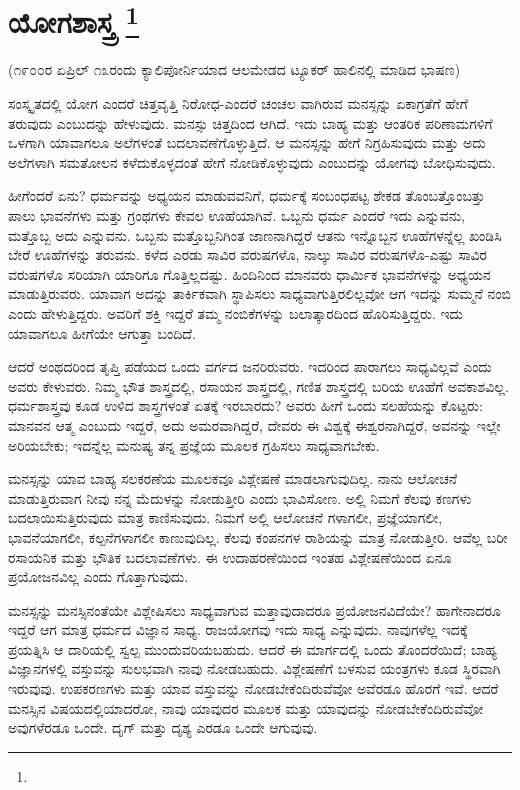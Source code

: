 
\chapter[ಯೋಗಶಾಸ್ತ್ರ ]{ಯೋಗಶಾಸ್ತ್ರ \protect\footnote{}}

\centerline{(೧೯೦೦ರ ಏಪ್ರಿಲ್​ ೧೩ರಂದು ಕ್ಯಾಲಿಪೋರ್ನಿಯಾದ ಆಲಮೇಡದ ಟ್ಯೂಕರ್​ ಹಾಲಿನಲ್ಲಿ ಮಾಡಿದ ಭಾಷಣ)}

ಸಂಸ್ಕೃತದಲ್ಲಿ ಯೋಗ ಎಂದರೆ ಚಿತ್ತವೃತ್ತಿ ನಿರೋಧ-ಎಂದರೆ ಚಂಚಲ ವಾಗಿರುವ ಮನಸ್ಸನ್ನು ಏಕಾಗ್ರತೆಗೆ ಹೇಗೆ ತರುವುದು ಎಂಬುದನ್ನು ಹೇಳುವುದು. ಮನಸ್ಸು ಚಿತ್ತದಿಂದ ಆಗಿದೆ. ಇದು ಬಾಹ್ಯ ಮತ್ತು ಆಂತರಿಕ ಪರಿಣಾಮಗಳಿಗೆ ಒಳಗಾಗಿ ಯಾವಾಗಲೂ ಅಲೆಗಳಂತೆ ಬದಲಾವಣೆಗೊಳ್ಳುತ್ತಿದೆ. ಆ ಮನಸ್ಸನ್ನು ಹೇಗೆ ನಿಗ್ರಹಿಸುವುದು ಮತ್ತು ಅದು ಅಲೆಗಳಾಗಿ ಸಮತೋಲನ ಕಳೆದುಕೊಳ್ಳದಂತೆ ಹೇಗೆ ನೋಡಿಕೊಳ್ಳುವುದು ಎಂಬುದನ್ನು ಯೋಗವು ಬೋಧಿಸುವುದು.

ಹೀಗೆಂದರೆ ಏನು? ಧರ್ಮವನ್ನು ಅಧ್ಯಯನ ಮಾಡುವವನಿಗೆ, ಧರ್ಮಕ್ಕೆ ಸಂಬಂಧಪಟ್ಟ ಶೇಕಡ ತೊಂಬತ್ತೊಂಬತ್ತು ಪಾಲು ಭಾವನೆಗಳು ಮತ್ತು ಗ್ರಂಥಗಳು ಕೇವಲ ಊಹೆಯಾಗಿವೆ. ಒಬ್ಬನು ಧರ್ಮ ಎಂದರೆ ಇದು ಎನ್ನುವನು, ಮತ್ತೊಬ್ಬ ಅದು ಎನ್ನುವನು. ಒಬ್ಬನು ಮತ್ತೊಬ್ಬನಿಗಿಂತ ಜಾಣನಾಗಿದ್ದರೆ ಆತನು ಇನ್ನೊಬ್ಬನ ಊಹೆಗಳನ್ನೆಲ್ಲ ಖಂಡಿಸಿ ಬೇರೆ ಊಹೆಗಳನ್ನು ತರುವನು. ಕಳೆದ ಎರಡು ಸಾವಿರ ವರುಷಗಳೊ, ನಾಲ್ಕು ಸಾವಿರ ವರುಷಗಳೊ-ಎಷ್ಟು ಸಾವಿರ ವರುಷಗಳೊ ಸರಿಯಾಗಿ ಯಾರಿಗೂ ಗೊತ್ತಿಲ್ಲದಷ್ಟು. ಹಿಂದಿನಿಂದ ಮಾನವರು ಧಾರ್ಮಿಕ ಭಾವನೆಗಳನ್ನು ಅಧ್ಯಯನ ಮಾಡುತ್ತಿರುವರು. ಯಾವಾಗ ಅದನ್ನು ತಾರ್ಕಿಕವಾಗಿ ಸ್ಥಾಪಿಸಲು ಸಾಧ್ಯವಾಗುತ್ತಿರಲಿಲ್ಲವೋ ಆಗ ಇದನ್ನು ಸುಮ್ಮನೆ ನಂಬಿ ಎಂದು ಹೇಳುತ್ತಿದ್ದರು. ಅವರಿಗೆ ಶಕ್ತಿ ಇದ್ದರೆ ತಮ್ಮ ನಂಬಿಕೆಗಳನ್ನು ಬಲಾತ್ಕಾರದಿಂದ ಹೊರಿಸುತ್ತಿದ್ದರು. ಇದು ಯಾವಾಗಲೂ ಹೀಗೆಯೇ ಆಗುತ್ತಾ ಬಂದಿದೆ.

ಆದರೆ ಅಂಥದರಿಂದ ತೃಪ್ತಿ ಪಡೆಯದ ಒಂದು ವರ್ಗದ ಜನರಿರುವರು. ಇದರಿಂದ ಪಾರಾಗಲು ಸಾಧ್ಯವಿಲ್ಲವೆ ಎಂದು ಅವರು ಕೇಳುವರು. ನಿಮ್ಮ ಭೌತ ಶಾಸ್ತ್ರದಲ್ಲಿ, ರಸಾಯನ ಶಾಸ್ತ್ರದಲ್ಲಿ, ಗಣಿತ ಶಾಸ್ತ್ರದಲ್ಲಿ ಬರಿಯ ಊಹೆಗೆ ಅವಕಾಶವಿಲ್ಲ. ಧರ್ಮಶಾಸ್ತ್ರವು ಕೂಡ ಉಳಿದ ಶಾಸ್ತ್ರಗಳಂತೆ ಏತಕ್ಕೆ ಇರಬಾರದು? ಅವರು ಹೀಗೆ ಒಂದು ಸಲಹೆಯನ್ನು ಕೊಟ್ಟರು: ಮಾನವನ ಆತ್ಮ ಎಂಬುದು ಇದ್ದರೆ, ಅದು ಅಮರವಾಗಿದ್ದರೆ, ದೇವರು ಈ ವಿಶ್ವಕ್ಕೆ ಈಶ್ವರನಾಗಿದ್ದರೆ, ಅವನನ್ನು ಇಲ್ಲೇ ಅರಿಯಬೇಕು; ಇದನ್ನೆಲ್ಲ ಮನುಷ್ಯ ತನ್ನ ಪ್ರಜ್ಞೆಯ ಮೂಲಕ ಗ್ರಹಿಸಲು ಸಾಧ್ಯವಾಗಬೇಕು.

ಮನಸ್ಸನ್ನು ಯಾವ ಬಾಹ್ಯ ಸಲಕರಣೆಯ ಮೂಲಕವೂ ವಿಶ್ಲೇಷಣೆ ಮಾಡಲಾಗುವುದಿಲ್ಲ. ನಾನು ಆಲೋಚನೆ ಮಾಡುತ್ತಿರುವಾಗ ನೀವು ನನ್ನ ಮೆದುಳನ್ನು ನೋಡುತ್ತೀರಿ ಎಂದು ಭಾವಿಸೋಣ. ಅಲ್ಲಿ ನಿಮಗೆ ಕೆಲವು ಕಣಗಳು ಬದಲಾಯಿಸುತ್ತಿರುವುದು ಮಾತ್ರ ಕಾಣಿಸುವುದು. ನಿಮಗೆ ಅಲ್ಲಿ ಆಲೋಚನೆ ಗಳಾಗಲೀ, ಪ್ರಜ್ಞೆಯಾಗಲೀ, ಭಾವನೆಯಾಗಲೀ, ಕಲ್ಪನೆಗಳಾಗಲೀ ಕಾಣುವುದಿಲ್ಲ. ಕೆಲವು ಕಂಪನಗಳ ರಾಶಿಯನ್ನು ಮಾತ್ರ ನೋಡುತ್ತೀರಿ. ಆವೆಲ್ಲ ಬರೀ ರಸಾಯನಿಕ ಮತ್ತು ಭೌತಿಕ ಬದಲಾವಣೆಗಳು. ಈ ಉದಾಹರಣೆಯಿಂದ ಇಂತಹ ವಿಶ್ಲೇಷಣೆಯಿಂದ ಏನೂ ಪ್ರಯೋಜನವಿಲ್ಲ ಎಂದು ಗೊತ್ತಾಗುವುದು.

ಮನಸ್ಸನ್ನು ಮನಸ್ಸಿನಂತೆಯೇ ವಿಶ್ಲೇಷಿಸಲು ಸಾಧ್ಯವಾಗುವ ಮತ್ತಾವುದಾದರೂ ಪ್ರಯೋಜನವಿದೆಯೇ? ಹಾಗೇನಾದರೂ ಇದ್ದರೆ ಆಗ ಮಾತ್ರ ಧರ್ಮದ ವಿಜ್ಞಾನ ಸಾಧ್ಯ. ರಾಜಯೋಗವು ಇದು ಸಾಧ್ಯ ಎನ್ನುವುದು. ನಾವುಗಳೆಲ್ಲ ಇದಕ್ಕೆ ಪ್ರಯತ್ನಿಸಿ ಆ ದಾರಿಯಲ್ಲಿ ಸ್ವಲ್ಪ ಮುಂದುವರಿಯಬಹುದು. ಆದರೆ ಈ ಮಾರ್ಗದಲ್ಲಿ ಒಂದು ತೊಂದರೆಯಿದೆ; ಬಾಹ್ಯ ವಿಜ್ಞಾನಗಳಲ್ಲಿ ವಸ್ತುವನ್ನು ಸುಲಭವಾಗಿ ನಾವು ನೋಡಬಹುದು. ವಿಶ್ಲೇಷಣೆಗೆ ಬಳಸುವ ಯಂತ್ರಗಳು ಕೂಡ ಸ್ಥಿರವಾಗಿ ಇರುವುವು. ಉಪಕರಣಗಳು ಮತ್ತು ಯಾವ ವಸ್ತುವನ್ನು ನೋಡಬೇಕೆಂದಿರುವೆವೋ ಅವೆರಡೂ ಹೊರಗೆ ಇವೆ. ಆದರೆ ಮನಸ್ಸಿನ ವಿಷಯದಲ್ಲಿಯಾದರೋ, ನಾವು ಯಾವುದರ ಮೂಲಕ ಮತ್ತು ಯಾವುದನ್ನು ನೋಡಬೇಕೆಂದಿರುವೆವೋ ಅವುಗಳೆರಡೂ ಒಂದೇ. ದೃಗ್​ ಮತ್ತು ದೃಶ್ಯ ಎರಡೂ ಒಂದೇ ಆಗುವುವು.

